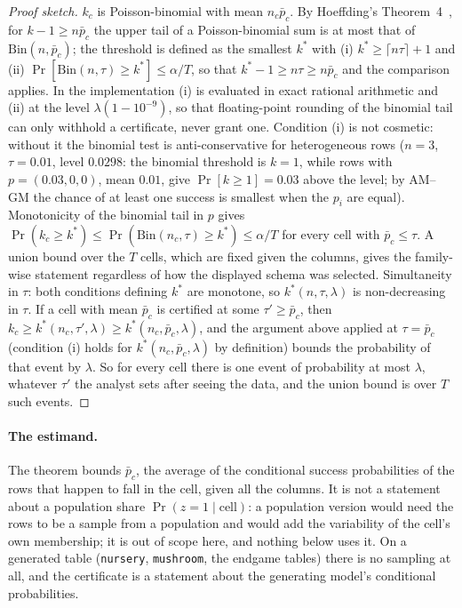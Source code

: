 \documentclass[11pt]{article}
\begin{document}
\begin{proof}[Proof sketch]
$k_c$ is Poisson-binomial with mean $n_c\bar p_c$. By Hoeffding's Theorem~4~\citep{hoeffding1956}, for $k-1\ge n\bar p_c$ the upper tail of a Poisson-binomial sum is at most that of $\mathrm{Bin}(n,\bar p_c)$; the threshold is defined as the smallest $k^*$ with (i) $k^*\ge\lceil n\tau\rceil+1$ and (ii) $\Pr[\mathrm{Bin}(n,\tau)\ge k^*]\le\alpha/T$, so that $k^*-1\ge n\tau\ge n\bar p_c$ and the comparison applies. In the implementation (i) is evaluated in exact rational arithmetic and (ii) at the level $\lambda(1-10^{-9})$, so that floating-point rounding of the binomial tail can only withhold a certificate, never grant one. Condition (i) is not cosmetic: without it the binomial test is anti-conservative for heterogeneous rows ($n=3$, $\tau=0.01$, level $0.0298$: the binomial threshold is $k=1$, while rows with $p=(0.03,0,0)$, mean $0.01$, give $\Pr[k\ge1]=0.03$ above the level; by AM--GM the chance of at least one success is smallest when the $p_i$ are equal). Monotonicity of the binomial tail in $p$ gives $\Pr(k_c\ge k^*)\le\Pr(\mathrm{Bin}(n_c,\tau)\ge k^*)\le\alpha/T$ for every cell with $\bar p_c\le\tau$. A union bound over the $T$ cells, which are fixed given the columns, gives the family-wise statement regardless of how the displayed schema was selected. Simultaneity in $\tau$: both conditions defining $k^*$ are monotone, so $k^*(n,\tau,\lambda)$ is non-decreasing in $\tau$. If a cell with mean $\bar p_c$ is certified at some $\tau'\ge\bar p_c$, then $k_c\ge k^*(n_c,\tau',\lambda)\ge k^*(n_c,\bar p_c,\lambda)$, and the argument above applied at $\tau=\bar p_c$ (condition (i) holds for $k^*(n_c,\bar p_c,\lambda)$ by definition) bounds the probability of that event by $\lambda$. So for every cell there is one event of probability at most $\lambda$, whatever $\tau'$ the analyst sets after seeing the data, and the union bound is over $T$ such events.
\end{proof}

\paragraph{The estimand.} The theorem bounds $\bar p_c$, the average of the conditional success probabilities of the rows that happen to fall in the cell, given all the columns. It is not a statement about a population share $\Pr(z=1\mid\text{cell})$: a population version would need the rows to be a sample from a population and would add the variability of the cell's own membership; it is out of scope here, and nothing below uses it. On a generated table (\texttt{nursery}, \texttt{mushroom}, the endgame tables) there is no sampling at all, and the certificate is a statement about the generating model's conditional probabilities.
\end{document}
